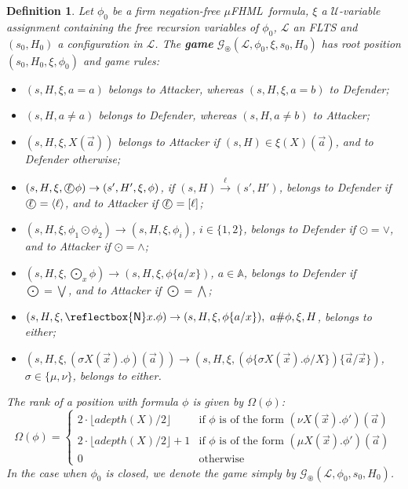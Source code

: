 \documentclass[10pt,a4paper]{article}
\newtheorem{definition}[theorem]{Definition}
\theoremstyle{definition}
\theoremstyle{remark}
\newcommand\boldemph[1]{\emph{\textbf{#1}}}
\newcommand\modal[1]{{\bigcirc\mspace{-13mu}#1}\ }
\newcommand\new[0]{\reflectbox{\ensuremath{\mathsf{N}}}}
\newcommand\fresh[1]{\new #1.}
\newcommand\fhml[0]{$\mu$FHML}
\newcommand\diam[1]{\langle#1\rangle}
\newcommand\Gcal{\mathcal{G}}
\newcommand\Lcal{\mathcal{L}}
\newcommand\Ucal{\mathcal{U}}
\newcommand\Atoms{\mathbb{A}}
\newcommand\fgame[0]{\Gcal_\circledast}
\begin{document}
\begin{definition}\label{def:parityG}
    Let $\phi_0$ be a firm negation-free \fhml\
    formula,
    $\xi$ a $\Ucal$-variable assignment containing the free recursion variables of $\phi_0$, $\Lcal$ an FLTS and $(s_0,H_0)$ a configuration in $\Lcal$.
    The \boldemph{game} $\fgame(\Lcal, \phi_0, \xi, s_0, H_0)$ has root position $(s_0, H_0, \xi, \phi_0)$ and game rules:
    \begin{itemize}
        \item $(s,H,\xi, a = a)$ belongs to Attacker, whereas
 $(s,H,\xi, a = b)$ to Defender;
        \item $(s,H, a \neq a)$ belongs to Defender, whereas 
 $(s,H, a \neq b)$  to Attacker;
        \item $(s,H,\xi, X(\vec a))$ belongs to Attacker if $(s, H)\in \xi(X)(\vec a)$, and to Defender otherwise;
        \item $(s,H,\xi, \modal{\ell}\phi) \rightarrow (s',H',\xi, \phi)$, if $(s, H) \xrightarrow{\ell} (s', H')$, belongs to Defender if $\modal{\ell}=\diam{\ell}$, and to Attacker if $\modal{\ell}=[\ell]$;
        \item $(s,H,\xi, \phi_1 \odot \phi_2) \rightarrow (s,H,\xi,\phi_i)$, $i \in \{1,2\}$, belongs to Defender if $\odot=\lor$, and to Attacker if $\odot=\land$;
                \item $(s,H,\xi, \bigodot\nolimits_x \phi) \rightarrow (s,H,\xi,\phi\{a/x\})$, $a \in \Atoms$, belongs to Defender if $\bigodot=\bigvee$, and to Attacker if $\bigodot=\bigwedge$;
                        \item $(s,H,\xi,\fresh{x}\phi) \rightarrow (s, H, \xi, \phi\{a/x\}),\ a \# \phi,\xi,H$, belongs to either;
        \item $(s,H,\xi, (\sigma X(\vec x).\phi)(\vec a)) \rightarrow (s, H, \xi,(\phi\{\sigma X(\vec x).\phi / X\})\{\vec a / \vec x\})$, $\sigma\in\{\mu,\nu\}$, belongs to either.
            \end{itemize}
              The rank of a position with formula $\phi$ is given by $\Omega(\phi)$:
    \[        \Omega(\phi) =
      \begin{cases} 2 \cdot \lfloor adepth(X)/2 \rfloor & \text{if $\phi$ is of the form }(\nu X(\vec x).\phi')(\vec a)\\
        2 \cdot \lfloor adepth(X)/2 \rfloor + 1 & \text{if $\phi$ is of the form }(\mu X(\vec x).\phi')(\vec a)\\
         0 &\text{otherwise}
      \end{cases}
    \]
In the case when $\phi_0$ is closed, we denote the game simply by $\fgame(\Lcal, \phi_0, s_0, H_0)$.    
\end{definition}
\end{document}

